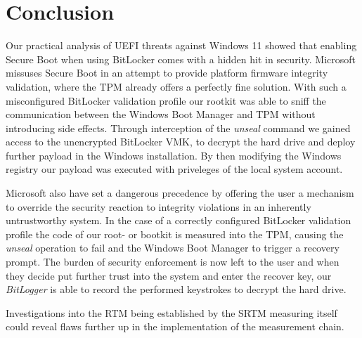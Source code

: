 
\chapter{Conclusion}

Our practical analysis of \ac{UEFI} threats against Windows 11 showed that enabling Secure Boot when using BitLocker comes with a hidden hit in security.
Microsoft missuses Secure Boot in an attempt to provide platform firmware integrity validation, where the \ac{TPM} already offers a perfectly fine solution.
With such a misconfigured BitLocker validation profile our rootkit was able to sniff the communication between the Windows Boot Manager and \ac{TPM} without introducing side effects.
Through interception of the \emph{unseal} command we gained access to the unencrypted BitLocker \ac{VMK}, to decrypt the hard drive and deploy further payload in the Windows installation.
By then modifying the Windows registry our payload was executed with priveleges of the local system account.

Microsoft also have set a dangerous precedence by offering the user a mechanism to override the security reaction to integrity violations in an inherently untrustworthy system.
In the case of a correctly configured BitLocker validation profile the code of our root- or bootkit is measured into the \ac{TPM}, causing the \emph{unseal} operation to fail and the Windows Boot Manager to trigger a recovery prompt.
The burden of security enforcement is now left to the user and when they decide put further trust into the system and enter the recover key, our \emph{BitLogger} is able to record the performed keystrokes to decrypt the hard drive.

Investigations into the \ac{RTM} being established by the \ac{SRTM} measuring itself could reveal flaws further up in the implementation of the measurement chain.
